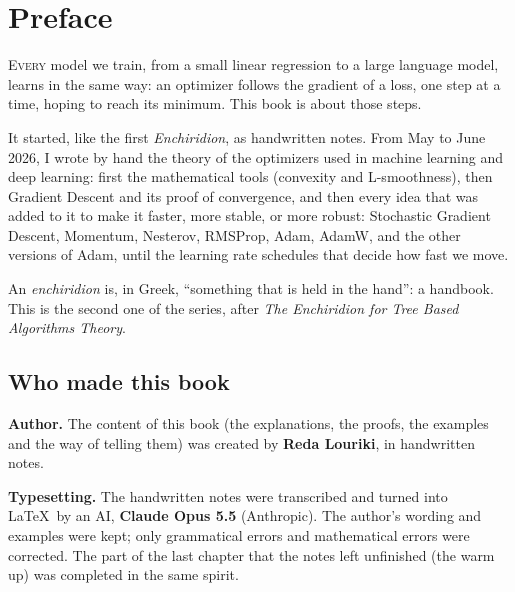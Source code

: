 \chapter*{Preface}

\lettrine[lines=2,findent=2pt,nindent=0pt]{\color{inkred}E}{very} model we train, from a small linear regression to a large language model, learns in the same way: an optimizer follows the gradient of a loss, one step at a time, hoping to reach its minimum. This book is about those steps.

It started, like the first \emph{Enchiridion}, as handwritten notes. From May to June 2026, I wrote by hand the theory of the optimizers used in machine learning and deep learning: first the mathematical tools (convexity and L-smoothness), then Gradient Descent and its proof of convergence, and then every idea that was added to it to make it faster, more stable, or more robust: Stochastic Gradient Descent, Momentum, Nesterov, RMSProp, Adam, AdamW, and the other versions of Adam, until the learning rate schedules that decide how fast we move.

An \emph{enchiridion} is, in Greek, ``something that is held in the hand'': a handbook. This is the second one of the series, after \emph{The Enchiridion for Tree Based Algorithms Theory}.

\section*{Who made this book}

\begin{tcolorbox}[colback=paper,colframe=goldleaf,boxrule=0.8pt,arc=3pt,left=12pt,right=12pt]
\textbf{Author.} The content of this book (the explanations, the proofs, the examples and the way of telling them) was created by \textbf{Reda Louriki}, in handwritten notes.

\medskip
\textbf{Typesetting.} The handwritten notes were transcribed and turned into \LaTeX\ by an AI, \textbf{Claude Opus 5.5} (Anthropic). The author's wording and examples were kept; only grammatical errors and mathematical errors were corrected. The part of the last chapter that the notes left unfinished (the warm up) was completed in the same spirit.
\end{tcolorbox}

